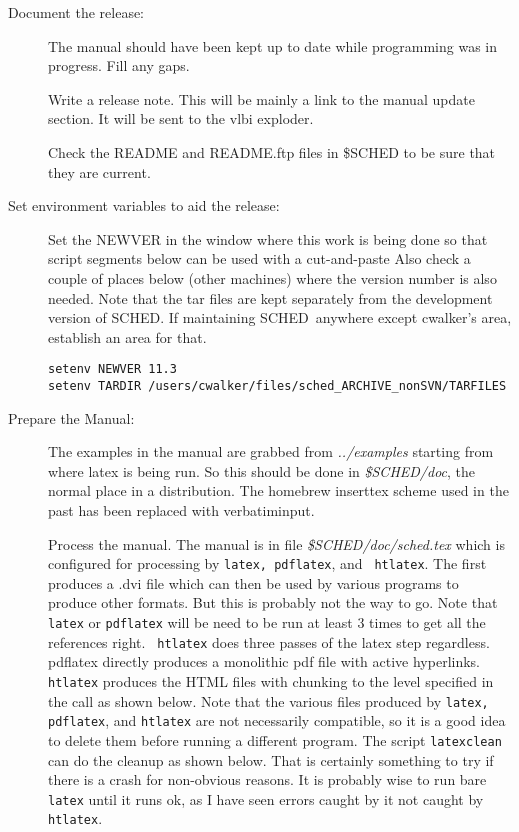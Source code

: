 \documentclass{report}
\newcommand{\sched}{{\sc SCHED}}
\newcommand{\schedb}{{\sc SCHED~}}
\begin{document}
\begin{description}
\item [Document the release:]

The manual should have been kept up to date while programming was in
progress.  Fill any gaps.

Write a release note.  This will be mainly a link to the manual
update section.  It will be sent to the vlbi exploder.

Check the README and README.ftp files in \$SCHED to be sure that
they are current.

      
\item [Set environment variables to aid the release:]

Set the NEWVER in the window where this work is being done so
that script segments below can be used with a cut-and-paste
Also check a couple of places below (other machines) where the
version number is also needed.  Note that the tar files are 
kept separately from the development version of \sched.  
If maintaining \schedb anywhere except cwalker's area, establish an
area for that.

\begin{verbatim}
setenv NEWVER 11.3
setenv TARDIR /users/cwalker/files/sched_ARCHIVE_nonSVN/TARFILES
\end{verbatim}

\item [Prepare the Manual:]

The examples in the manual are grabbed from {\sl ../examples} starting
from where latex is being run.  So this should be done in {\sl
\$SCHED/doc}, the normal place in a distribution.  The homebrew
inserttex scheme used in the past has been replaced with
verbatiminput.

Process the manual.  The manual is in file {\sl \$SCHED/doc/sched.tex}
which is configured for processing by {\tt latex, pdflatex}, and {\tt
htlatex}.  The first produces a .dvi file which can then be used by
various programs to produce other formats.  But this is probably not
the way to go.  Note that {\tt latex} or {\tt pdflatex} will be need
to be run at least 3 times to get all the references right.  {\tt
htlatex} does three passes of the latex step regardless.  pdflatex
directly produces a monolithic pdf file with active hyperlinks.  {\tt
htlatex} produces the HTML files with chunking to the level specified
in the call as shown below.  Note that the various files produced by
{\tt latex, pdflatex}, and {\tt htlatex} are not necessarily
compatible, so it is a good idea to delete them before running a
different program.  The script {\tt latexclean} can do the cleanup as
shown below.  That is certainly something to try if there is a crash
for non-obvious reasons.  It is probably wise to run bare {\tt latex}
until it runs ok, as I have seen errors caught by it not caught by
{\tt htlatex}.


\end{description}
\end{document}
